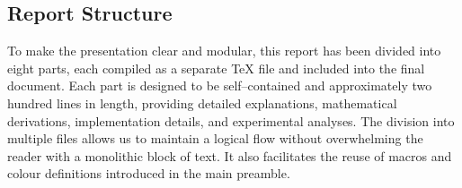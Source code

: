 \subsection{Report Structure}

To make the presentation clear and modular, this report has been divided
into eight parts, each compiled as a separate \TeX{} file and included into
the final document.  Each part is designed to be self–contained and
approximately two hundred lines in length, providing detailed explanations,
mathematical derivations, implementation details, and experimental analyses.
The division into multiple files allows us to maintain a logical flow
without overwhelming the reader with a monolithic block of text.  It also
facilitates the reuse of macros and colour definitions introduced in the
main preamble.

